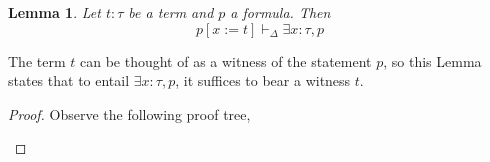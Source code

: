 \documentclass{birkjour}
\theoremstyle{plain}
\newtheorem{lemma}[thm]{Lemma}
\theoremstyle{definition}
\begin{document}
	\begin{lemma}
		\label{lem:witness}
		Let $t:\tau$ be a term and $p$ a formula. Then
		\[p[x := t] \vdash_{\Delta} \exists x : \tau, p\]
	\end{lemma}
	The term $t$ can be thought of as a witness of the statement $p$, so this Lemma states that to entail $\exists x : \tau, p$, it suffices to bear a witness $t$.
	\begin{proof} Observe the following proof tree,
		\begin{prooftree}
			\RightLabel{$\eqref{rule:existential}$}
			\RightLabel{$\eqref{rule:sub}$}
		\end{prooftree}
	\end{proof}
	
\end{document}
